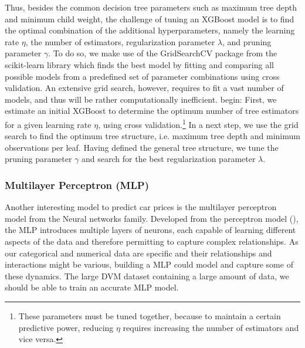 \documentclass[12pt]{article}
\begin{document}
\noindent Thus, besides the common decision tree parameters such as maximum tree depth and minimum child weight, the challenge of tuning an XGBoost model is to find the optimal combination of the additional hyperparameters, namely the learning rate $\eta$, the number of estimators, regularization parameter $\lambda$, and pruning parameter $\gamma$. To do so, we make use of the GridSearchCV package from the scikit-learn library which finds the best model by fitting and comparing all possible models from a predefined set of parameter combinations using cross validation. An extensive grid search, however, requires to fit a vast number of models, and thus will be rather computationally inefficient. begin: First, we estimate an initial XGBoost to determine the optimum number of tree estimators for a given learning rate $\eta$, using cross validation.\footnote{These parameters must be tuned together, because to maintain a certain predictive power, reducing $\eta$ requires increasing the number of estimators and vice versa.} In a next step, we use the grid search to find the optimum tree structure, i.e. maximum tree depth and minimum observations per leaf. Having defined the general tree structure, we tune the pruning parameter $\gamma$ and search for the best regularization parameter $\lambda$.


\subsubsection{Multilayer Perceptron (MLP)}

\noindent Another interesting model to predict car prices is the multilayer perceptron model from the Neural networks family. 
\noindent Developed from the perceptron model (\cite{Rosenblatt1958}), the MLP introduces multiple layers of neurons, each capable of learning different aspects of the data and therefore permitting to capture complex relationships. As our categorical and numerical data are specific and their relationships and interactions might be various, building a MLP could model and capture some of these dynamics. The large DVM dataset containing a large amount of data, we should be able to train an accurate MLP model.\\
\end{document}
